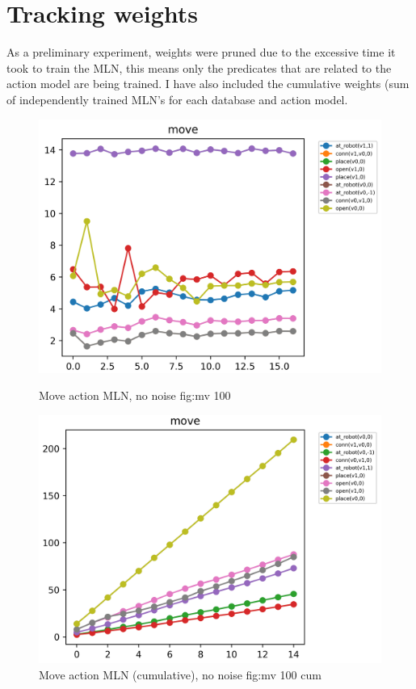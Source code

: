 \section{Tracking weights}
As a preliminary experiment, weights were pruned due to the excessive time it took to train the MLN, this means only the predicates that are related to the action model are being trained.
I have also included the cumulative weights (sum of independently trained MLN's for each database and action model.


\begin{figure}[h]
 \centering
 \begin{minipage}[b]{0.49\linewidth}
 \includegraphics[width=1\textwidth]{images/tests/movegraph_100}
 \caption{Move action MLN, no noise {fig:mv 100}}

 \end{minipage}
 \hfill
 \begin{minipage}[b]{0.49\linewidth}

 \includegraphics[width=1\textwidth]{images/tests/movegraph_100_cum}
 \caption{Move action MLN (cumulative), no noise {fig:mv 100 cum}}

 \end{minipage}
\end{figure}


